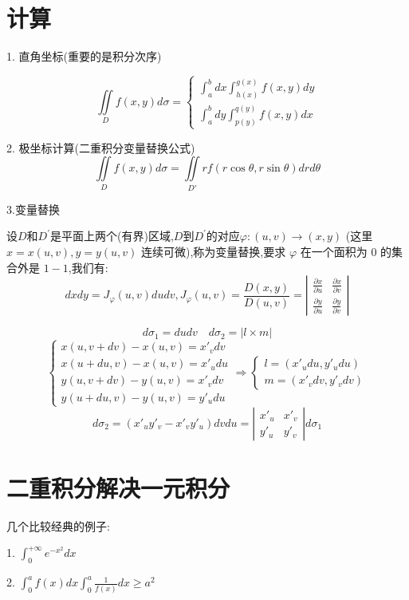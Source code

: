 \section{计算}

1. 直角坐标(重要的是积分次序)\label{def: 积分次序}

$$\iint\limits_{D}f(x,y)d\sigma=\left\lbrace\begin{array}{l}
		\int_{a}^{b}dx\int_{h(x)}^{g(x)}f(x,y)dy \\	\int_{a}^{b}dy\int_{p(y)}^{q(y)}f(x,y)dx
	\end{array}\right. $$

2. 极坐标计算(二重积分变量替换公式)\label{def: 极坐标计算二重积分}
$$\iint\limits_{D}f(x,y)d\sigma=\iint\limits_{D'}rf(r\cos \theta,r\sin \theta)drd\theta$$

3.变量替换\label{def: 变量替换}

设$D$和$D^{'}$是平面上两个(有界)区域,$D$到$D^{'}$的对应$\varphi :(u,v)\rightarrow(x,y)$ (这里 $x=x(u,v),y=y(u,v)$ 连续可微),称为变量替换,要求 $\varphi$ 在一个面积为 $0$ 的集合外是 $1-1$,我们有:
$$dxdy=J_{\varphi}(u,v)dudv, J_{\varphi}(u,v)=\dfrac{D(x,y)}{D(u,v)}=\left| \begin{matrix}
		\frac{\partial x}{\partial u} & \frac{\partial x}{\partial v} \\
		\frac{\partial y}{\partial u} & \frac{\partial y}{\partial v}
	\end{matrix}
	\right| $$

\begin{anymark}[注]
	$$d\sigma_{1}=dudv \quad d\sigma_{2}=|l\times m|$$
	$$\left\lbrace
		\begin{array}{l}
			x(u,v+dv)-x(u,v)=x'_{v}dv \\
			x(u+du,v)-x(u,v)=x'_{u}du \\
			y(u,v+dv)-y(u,v)=x'_{v}dv \\
			y(u+du,v)-y(u,v)=y'_{u}du
		\end{array}
		\right. \Rightarrow \left\lbrace
		\begin{array}{l}
			l=(x'_{u}du,y'_{u}du) \\
			m=(x'_{v}dv,y'_{v}dv)
		\end{array}
		\right.$$
	$$d\sigma_{2}=(x'_{u}y'_{v}-x'_{v}y'_{u})dvdu=\left| \begin{matrix}
			x'_{u} & x'_{v} \\
			y'_{u} & y'_{v}
		\end{matrix}
		\right| d\sigma_{1}$$
\end{anymark}
\section{二重积分解决一元积分}
几个比较经典的例子:

1. $\int_{0}^{+\infty}e^{-x^2}dx$

2. $\int_{0}^{a}f(x)dx\int_{0}^{a}\frac{1}{f(x)}dx\geq a^{2}$


